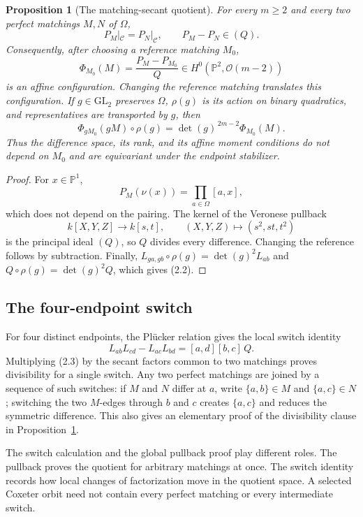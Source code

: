 \documentclass[11pt]{article}
\newtheorem{proposition}[theorem]{Proposition}
\theoremstyle{definition}
\theoremstyle{remark}
\newcommand{\cC}{\mathcal{C}}
\begin{document}
\begin{proposition}[The matching-secant quotient]
\label{prop:matching-secant-quotient}
For every $m\ge2$ and every two perfect matchings $M,N$ of $\Omega$,
\[
 P_M|_{\cC}=P_N|_{\cC},\qquad P_M-P_N\in(Q).
\]
Consequently, after choosing a reference matching $M_0$,
\[
 \Phi_{M_0}(M)=\frac{P_M-P_{M_0}}{Q}
       \in H^0(\mathbb P^2,\mathcal O(m-2))
                                                        \tag{2.1}
\]
is an affine configuration.  Changing the reference matching translates
this configuration.  If $g\in\mathrm{GL}_2$ preserves $\Omega$,
$\rho(g)$ is its action on binary quadratics, and representatives are
transported by $g$, then
\[
 \Phi_{gM_0}(gM)\circ\rho(g)
   =\det(g)^{\,2m-2}\Phi_{M_0}(M).                       \tag{2.2}
\]
Thus the difference space, its rank, and its affine moment conditions do
not depend on $M_0$ and are equivariant under the endpoint stabilizer.
\end{proposition}

\begin{proof}
For $x\in\mathbb P^1$,
\[
 P_M(\nu(x))=\prod_{a\in\Omega}[a,x],
\]
which does not depend on the pairing.  The kernel of the Veronese
pullback
\[
 k[X,Y,Z]\longrightarrow k[s,t],\qquad
 (X,Y,Z)\longmapsto(s^2,st,t^2)
\]
is the principal ideal $(Q)$, so $Q$ divides every difference.
Changing the reference follows by subtraction.  Finally,
$L_{ga,gb}\circ\rho(g)=\det(g)^2L_{ab}$ and
$Q\circ\rho(g)=\det(g)^2Q$, which gives (2.2).
\end{proof}

\subsection{The four-endpoint switch}
\label{sec:switches}

For four distinct endpoints, the Pl\"ucker relation gives the local
switch identity
\[
 L_{ab}L_{cd}-L_{ac}L_{bd}
   =[a,d][b,c]\,Q.                                      \tag{2.3}
\]
Multiplying (2.3) by the secant factors common to two matchings proves
divisibility for a single switch.  Any two perfect matchings are joined
by a sequence of such switches: if $M$ and $N$ differ at $a$, write
$\{a,b\}\in M$ and $\{a,c\}\in N$; switching the two $M$-edges through
$b$ and $c$ creates $\{a,c\}$ and reduces the symmetric difference.
This also gives an elementary proof of the divisibility clause in
Proposition~\ref{prop:matching-secant-quotient}.

The switch calculation and the global pullback proof play different
roles.  The pullback proves the quotient for arbitrary matchings at once.
The switch identity records how local changes of factorization move in
the quotient space.  A selected Coxeter orbit need not contain every
perfect matching or every intermediate switch.
\end{document}

